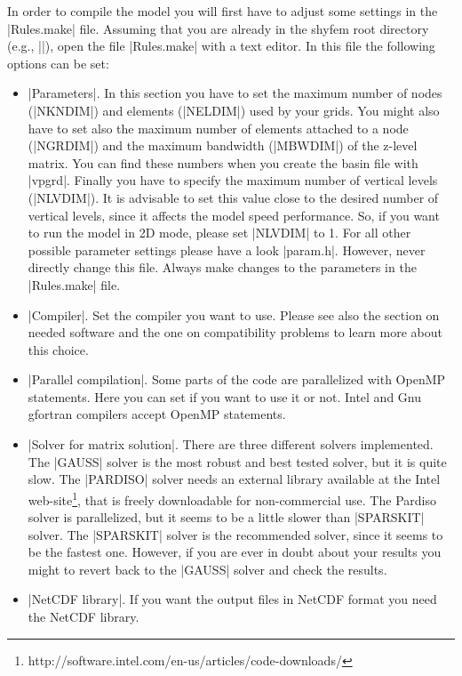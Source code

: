 
In order to compile the model you will first have to adjust some settings
in the |Rules.make| file. Assuming that you are already in the shyfem
root directory (e.g., |\shydir|), open the file |Rules.make| with a
text editor.  In this file the following options can be set:

\begin{itemize}

\item |Parameters|. In this section you have to set the maximum number
of nodes (|NKNDIM|) and elements (|NELDIM|) used by your grids. You
might also have to set also the maximum number of elements attached to
a node (|NGRDIM|) and the maximum bandwidth (|MBWDIM|) of the z-level
matrix. You can find these numbers when you create the basin file with
|vpgrd|. Finally you have to specify the maximum number of vertical levels
(|NLVDIM|).  It is advisable to set this value close to the desired number
of vertical levels, since it affects the model speed performance. So,
if you want to run the model in 2D mode, please set |NLVDIM| to 1.
For all other possible parameter settings please have a look |param.h|.
However, never directly change this file. Always make changes to the
parameters in the |Rules.make| file.

\item |Compiler|. Set the compiler you want to use. Please see also
the section on needed software and the one on compatibility problems to
learn more about this choice.

\item |Parallel compilation|. Some parts of the code are parallelized
with OpenMP statements. Here you can set if you want to use it or not.
Intel and Gnu gfortran compilers accept OpenMP statements.

\item |Solver for matrix solution|. There are three
different solvers implemented.  The |GAUSS| solver is the
most robust and best tested solver, but it is quite slow. The
|PARDISO| solver needs an external library available at the Intel
web-site\footnote{http://software.intel.com/en-us/articles/code-downloads/},
that is freely downloadable for non-commercial use.  The Pardiso solver is
parallelized, but it seems to be a little slower than |SPARSKIT| solver.
The |SPARSKIT| solver is the recommended solver, since it seems to be the
fastest one. However, if you are ever in doubt about your results you
might to revert back to the |GAUSS| solver and check the results.

\item |NetCDF library|. If you want the output files in NetCDF format
you need the NetCDF library.


\end{itemize}

